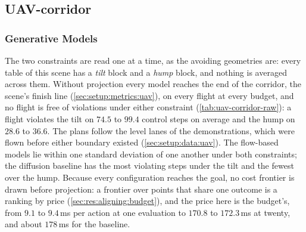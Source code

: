 \subsection{UAV-corridor}\label{sec:res:uav:corridor}

\subsubsection{Generative Models}\label{sec:res:uav:corridor:raw}
The two constraints are read one at a time, as the avoiding geometries are: every table of this scene has a
\emph{tilt} block and a \emph{hump} block, and nothing is averaged across them.
Without projection every model reaches the end of the corridor, the scene's finish line
(\autoref{sec:setup:metrics:uav}), on every flight at every budget, and no flight is free of violations
under either constraint (\autoref{tab:uav-corridor-raw}): a flight violates the tilt on
$74.5$ to $99.4$ control steps on average and the hump on $28.6$ to $36.6$. The plans follow the level
lanes of the demonstrations, which were flown before either boundary existed
(\autoref{sec:setup:data:uav}). The flow-based models lie within one standard deviation of one another
under both constraints; the diffusion baseline has the most violating steps under the tilt and the fewest
over the hump. Because every configuration reaches the goal, no cost frontier is drawn before projection:
a frontier over points that share one outcome is a ranking by price (\autoref{sec:res:aligning:budget}),
and the price here is the budget's, from $9.1$ to $9.4$\,ms per action at one evaluation to $170.8$ to
$172.3$\,ms at twenty, and about $178$\,ms for the baseline.


